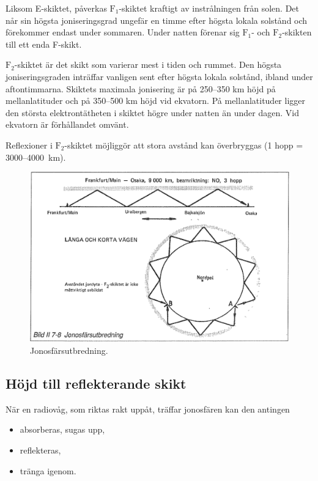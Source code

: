 Liksom E-skiktet, påverkas \(\mathrm{F_1}\)-skiktet kraftigt av
instrålningen från solen. Det når sin högsta joniseringsgrad ungefär
en timme efter högsta lokala solstånd och förekommer endast under
sommaren. Under natten förenar sig \(\mathrm{F_1}\)- och
\(\mathrm{F_2}\)-skikten till ett enda F-skikt.

\(\mathrm{F_2}\)-skiktet är det skikt som varierar mest i tiden och
rummet. Den högsta joniseringsgraden inträffar vanligen sent efter
högsta lokala solstånd, ibland under aftontimmarna.  Skiktets maximala
jonisering är på 250--350 km höjd på mellanlatituder och på 350--500
km höjd vid ekvatorn. På mellanlatituder ligger den största
elektrontätheten i skiktet högre under natten än under dagen. Vid
ekvatorn är förhållandet omvänt.

Reflexioner i \(\mathrm{F_2}\)-skiktet möjliggör att stora
avstånd kan överbryggas (1 hopp = 3000--4000~km).

\begin{figure}
  \includegraphics[width=\textwidth]{images/bild_2_7-08}
  \caption{Jonosfärsutbredning.}
  \label{fig:bildII7-8}
\end{figure}

\subsection{Höjd till reflekterande skikt}

När en radiovåg, som riktas rakt uppåt, träffar jonosfären kan den antingen
\begin{itemize}
\item absorberas, sugas upp,
\item reflekteras,
\item tränga igenom.
\end{itemize}

